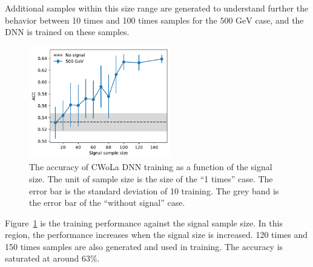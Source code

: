 \documentclass[12pt]{article}
\begin{document}
        Additional samples within this size range are generated to understand further the behavior between 10 times and 100 times samples for the $\text{500 GeV}$ case, and the DNN is trained on these samples.

        \begin{figure}[htpb]
            \centering
            \includegraphics[width=0.55\textwidth]{ACC_vs_signal_sample_size-500GeV.pdf}
            \caption{The accuracy of CWoLa DNN training as a function of the signal size. The unit of sample size is the size of the ``1 times'' case. The error bar is the standard deviation of 10 training. The grey band is the error bar of the ``without signal'' case.}
            \label{fig:cwola_hunting_DNN_results_wo_pt_m_various_signal_size_500GeV}
        \end{figure}

        Figure~\ref{fig:cwola_hunting_DNN_results_wo_pt_m_various_signal_size_500GeV} is the training performance against the signal sample size. In this region, the performance increases when the signal size is increased. 120 times and 150 times samples are also generated and used in training. The accuracy is saturated at around 63\%.
\end{document}
